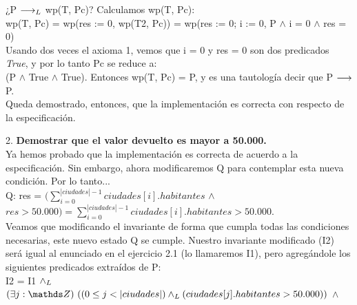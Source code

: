 \documentclass[10pt,a4paper]{article}
\begin{document}
\begin{enumerate}
    ¿P $\longrightarrow _L$ wp(T, Pc)? Calculamos wp(T, Pc):\\

    wp(T, Pc) = wp(res := 0, wp(T2, Pc)) = wp(res := 0; i := 0, P $\wedge$ i = 0 $\wedge$ res = 0)\\ 
    Usando dos veces el axioma 1, vemos que i = 0 y res = 0 son dos predicados \textit{True}, y por lo tanto Pc se reduce a:\\ (P $\wedge$ True $\wedge$ True). Entonces wp(T, Pc) = P, y es una tautología decir que P $\longrightarrow$ P.\\
    Queda demostrado, entonces, que la implementación es correcta con respecto de la especificación.\\
\end{enumerate}
    
    

2. \textbf{Demostrar que el valor devuelto es mayor a 50.000.}\\

Ya hemos probado que la implementación es correcta de acuerdo a la especificación. Sin embargo, ahora modificaremos Q para contemplar esta nueva condición. Por lo tanto...\\
Q: res = $(\sum\limits_{i=0}^{|ciudades| - 1}ciudades[i].habitantes$ $\wedge$ $ res > 50.000) = \sum\limits_{i=0}^{|ciudades| - 1}ciudades[i].habitantes > 50.000$.\\ 

Veamos que modificando el invariante de forma que cumpla todas las condiciones necesarias, este nuevo estado Q se cumple. Nuestro invariante modificado (I2) será igual al enunciado en el ejercicio 2.1 (lo llamaremos I1), pero agregándole los siguientes predicados extraídos de P:\\

I2 = I1 $\land _L$ ${\existe[unalinea]{j}{\ent}{(0 \leq j < |ciudades|) \yLuego (ciudades[j].habitantes > 50.000)}} $ $\wedge$\\
    \\
\end{document}
